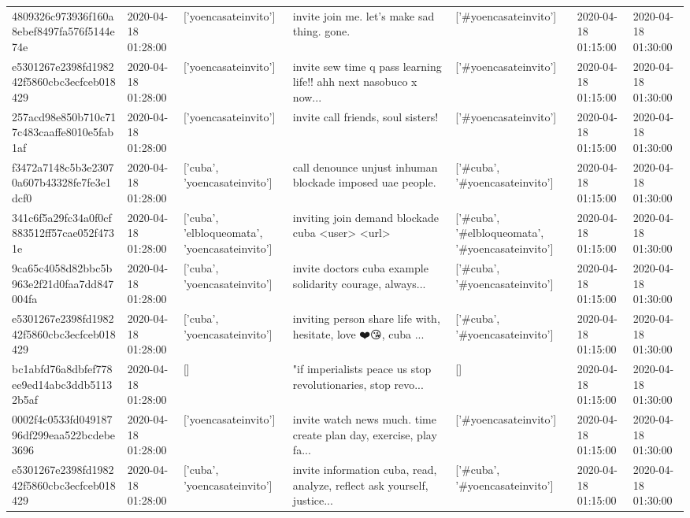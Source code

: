 \begin{tabular}{lllllll}
4809326c973936f160a8ebef8497fa576f5144e74e & 2020-04-18 01:28:00 & ['yoencasateinvito'] & invite join me. let's make sad thing. gone. & ['#yoencasateinvito'] & 2020-04-18 01:15:00 & 2020-04-18 01:30:00 \\
e5301267e2398fd198242f5860cbc3ecfceb018429 & 2020-04-18 01:28:00 & ['yoencasateinvito'] & invite sew time q pass learning life!! ahh next nasobuco x now... & ['#yoencasateinvito'] & 2020-04-18 01:15:00 & 2020-04-18 01:30:00 \\
257acd98e850b710c717c483caaffe8010e5fab1af & 2020-04-18 01:28:00 & ['yoencasateinvito'] & invite call friends, soul sisters! & ['#yoencasateinvito'] & 2020-04-18 01:15:00 & 2020-04-18 01:30:00 \\
f3472a7148c5b3e23070a607b43328fe7fe3e1dcf0 & 2020-04-18 01:28:00 & ['cuba', 'yoencasateinvito'] & call denounce unjust inhuman blockade imposed uae people. & ['#cuba', '#yoencasateinvito'] & 2020-04-18 01:15:00 & 2020-04-18 01:30:00 \\
341c6f5a29fc34a0f0cf883512ff57cae052f4731e & 2020-04-18 01:28:00 & ['cuba', 'elbloqueomata', 'yoencasateinvito'] & inviting join demand blockade cuba <user> <url> & ['#cuba', '#elbloqueomata', '#yoencasateinvito'] & 2020-04-18 01:15:00 & 2020-04-18 01:30:00 \\
9ca65c4058d82bbc5b963e2f21d0faa7dd847004fa & 2020-04-18 01:28:00 & ['cuba', 'yoencasateinvito'] & invite doctors cuba example solidarity courage, always... & ['#cuba', '#yoencasateinvito'] & 2020-04-18 01:15:00 & 2020-04-18 01:30:00 \\
e5301267e2398fd198242f5860cbc3ecfceb018429 & 2020-04-18 01:28:00 & ['cuba', 'yoencasateinvito'] & inviting person share life with, hesitate, love ❤️😘, cuba ... & ['#cuba', '#yoencasateinvito'] & 2020-04-18 01:15:00 & 2020-04-18 01:30:00 \\
bc1abfd76a8dbfef778ee9ed14abc3ddb51132b5af & 2020-04-18 01:28:00 & [] & "if imperialists peace us stop revolutionaries, stop revo... & [] & 2020-04-18 01:15:00 & 2020-04-18 01:30:00 \\
0002f4c0533fd04918796df299eaa522bcdebe3696 & 2020-04-18 01:28:00 & ['yoencasateinvito'] & invite watch news much. time create plan day, exercise, play fa... & ['#yoencasateinvito'] & 2020-04-18 01:15:00 & 2020-04-18 01:30:00 \\
e5301267e2398fd198242f5860cbc3ecfceb018429 & 2020-04-18 01:28:00 & ['cuba', 'yoencasateinvito'] & invite information cuba, read, analyze, reflect ask yourself, justice... & ['#cuba', '#yoencasateinvito'] & 2020-04-18 01:15:00 & 2020-04-18 01:30:00 \\

\end{tabular}
